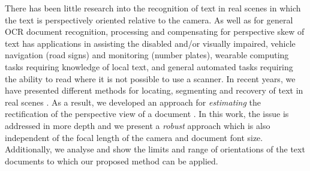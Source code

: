 \documentclass{elsart}   %
\begin{document}
There has been little research into the recognition of text in real scenes in
which the text is perspectively oriented relative to the camera.  As well as for
general OCR document recognition, processing and compensating for perspective
skew of text has applications in assisting the disabled and/or visually
impaired, vehicle navigation (road signs) and monitoring (number plates), wearable
computing tasks requiring knowledge of local text, and general automated tasks
requiring the ability to read where it is not possible to use a scanner. In
recent years, we have presented different methods for locating, segmenting and
recovery of text in real scenes
\cite{ClarkICPR2000,2001-clark,justin,clark-ijdar-2001}. As a result, we
developed an approach for {\em estimating} the rectification of the perspective
view of a document \cite{2001-clark,clark-ijdar-2001}. In this work,  
the issue is addressed in more depth and we present a {\em robust} approach
which is also independent of the focal length of
the camera and document font size. Additionally, we analyse and show the limits
and range of orientations of the text documents to which our proposed method can
be applied.


\end{document}
